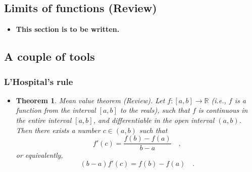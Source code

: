 \documentclass[12pt]{book}
\newtheorem{theorem}{Theorem}[section]
\begin{document}
\subsection{Limits of functions (Review)}
\begin{itemize}
\item \textbf{This section is to be written.}
\end{itemize}
\subsection{A couple of tools}
\subsubsection{L'Hospital's rule}
\begin{itemize}
\item 
\begin{theorem}
 Mean value theorem (Review). Let $f:[a,b]\to \mathbb R$ (i.e., $f$ is a function from the interval $[a,b]$ to the reals), such that $f$ is continuous in the entire interval $[a,b]$, and differentiable in the open interval $(a,b)$. Then there exists a number $c\in (a,b)$ such that 
\[
f'(c)=\frac{f(b)-f(a)}{b-a}\quad,
\]
or equivalently,
\[
(b-a)f'(c)=f(b)-f(a)\quad .
\]
\end{theorem}


\end{itemize}
\end{document}
